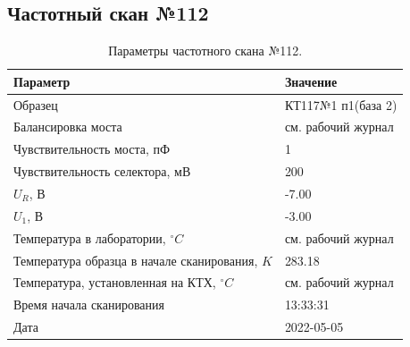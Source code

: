 \subsection{Частотный скан №112}
\begin{table}[!ht]
    \centering
    \caption{Параметры частотного скана №112.}
    \begin{tabular}{|l|l|}
        \hline
        Параметр                                       & Значение                  \\ \hline
        Образец                                        & КТ117№1 п1(база 2)        \\ \hline
        Балансировка моста                             & см. рабочий журнал        \\ \hline
        Чувствительность моста, пФ                     & 1                         \\ \hline
        Чувствительность селектора, мВ                 & 200                       \\ \hline
        $U_R$, В                                       & -7.00                     \\ \hline
        $U_1$, В                                       & -3.00                     \\ \hline
        Температура в лаборатории, $^\circ C$          & см. рабочий журнал        \\ \hline
        Температура образца в начале сканирования, $K$ & 283.18                    \\ \hline
        Температура, установленная на КТХ, $^\circ C$  & см. рабочий журнал        \\ \hline
        Время начала сканирования                      & 13:33:31                  \\ \hline
        Дата                                           & 2022-05-05                \\ \hline
    \end{tabular}
    \label{table:frequency_scan_112}
\end{table}

